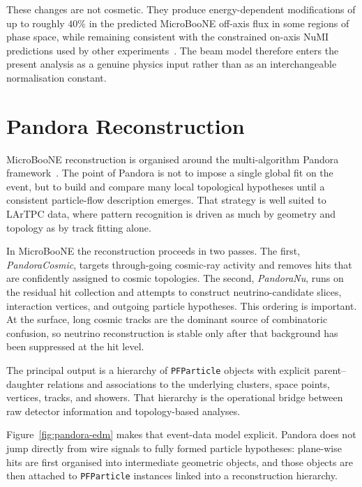 These changes are not cosmetic. They produce energy-dependent modifications of
up to roughly \(40\%\) in the predicted
MicroBooNE off-axis flux in some regions of phase space, while remaining
consistent with the constrained on-axis NuMI predictions used by other
experiments~\cite{Aliaga:2016NuMIPRD,MicroBooNE:2025NuMIFlux}. The beam model
therefore enters the present analysis as a genuine physics input rather than as
an interchangeable normalisation constant.

\section{Pandora Reconstruction}

MicroBooNE reconstruction is organised around the multi-algorithm Pandora
framework~\cite{MarshallThomson:2015PandoraSDK,Acciarri:2018PandoraMicroBooNE}.
The point of Pandora is not to impose a single global fit on the event, but to
build and compare many local topological hypotheses until a consistent
particle-flow description emerges. That strategy is well suited to LArTPC data,
where pattern recognition is driven as much by geometry and topology as by
track fitting alone.

In MicroBooNE the reconstruction proceeds in two passes. The first,
\emph{PandoraCosmic}, targets through-going cosmic-ray activity and removes
hits that are confidently assigned to cosmic topologies. The second,
\emph{PandoraNu}, runs on the residual hit collection and attempts to construct
neutrino-candidate slices, interaction vertices, and outgoing particle
hypotheses. This ordering is important. At the surface, long cosmic tracks are
the dominant source of combinatoric confusion, so neutrino reconstruction is
stable only after that background has been suppressed at the hit level.

The principal output is a hierarchy of \texttt{PFParticle} objects with
explicit parent--daughter relations and associations to the underlying clusters,
space points, vertices, tracks, and showers. That hierarchy is the operational
bridge between raw detector information and topology-based analyses.

Figure~\ref{fig:pandora-edm} makes that event-data model explicit. Pandora does
not jump directly from wire signals to fully formed particle hypotheses:
plane-wise hits are first organised into intermediate geometric objects, and
those objects are then attached to \texttt{PFParticle} instances linked into a
reconstruction hierarchy.

